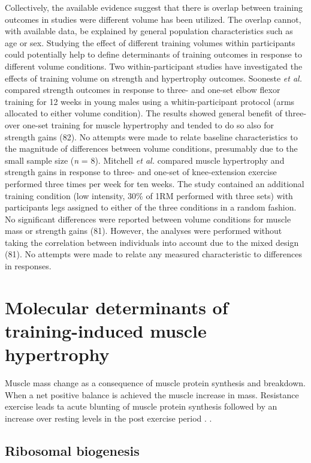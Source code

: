 \documentclass[twoside,10pt]{gihclass} %
\begin{document}
Collectively, the available evidence suggest that there is overlap between training outcomes in studies were different volume has been utilized.
The overlap cannot, with available data, be explained by general population characteristics such as age or sex.
Studying the effect of different training volumes within participants could potentially help to define determinants of training outcomes in response to different volume conditions.
Two within-participant studies have investigated the effects of training volume on strength and hypertrophy outcomes.
Sooneste \emph{et al.} compared strength outcomes in response to three- and one-set elbow flexor training for 12 weeks in young males using a whitin-participant protocol (arms allocated to either volume condition).
The results showed general benefit of three- over one-set training for muscle hypertrophy and tended to do so also for strength gains (82).
No attempts were made to relate baseline characteristics to the magnitude of differences between volume conditions, presumably due to the small sample size (\emph{n} = 8).
Mitchell \emph{et al.} compared muscle hypertrophy and strength gains in response to three- and one-set of knee-extension exercise performed three times per week for ten weeks.
The study contained an additional training condition (low intensity, 30\% of 1RM performed with three sets) with participants legs assigned to either of the three conditions in a random fashion.
No significant differences were reported between volume conditions for muscle mass or strength gains (81).
However, the analyses were performed without taking the correlation between individuals into account due to the mixed design (81).
No attempts were made to relate any measured characteristic to differences in responses.

\hypertarget{molecular-determinants-of-training-induced-muscle-hypertrophy}{%
\section{Molecular determinants of training-induced muscle hypertrophy}\label{molecular-determinants-of-training-induced-muscle-hypertrophy}}

Muscle mass change as a consequence of muscle protein synthesis and breakdown. When a net positive balance is achieved the muscle increase in mass. Resistance exercise leads ta acute blunting of muscle protein synthesis followed by an increase over resting levels in the post exercise period
.
.

\hypertarget{ribosomal-biogenesis}{%
\subsection{Ribosomal biogenesis}\label{ribosomal-biogenesis}}
\end{document}
